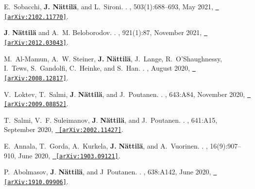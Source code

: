\documentclass[letterpaper, onecolumn, 11pt]{article}
\begin{document}
\begin{thebibliography}{10}
E.~{Sobacchi}, \textbf{J. {N{\"a}ttil{\"a}}}, and L.~{Sironi}.
.
\newblock {\em \mnras}, 503(1):688--693, May 2021,
  \href{http://arxiv.org/abs/2102.11770}{\nolinkurl{ [arXiv:2102.11770]}}.

\textbf{J}. \textbf{N{\"a}ttil{\"a}} and A.~M. {Beloborodov}.
.
\newblock {\em \apj}, 921(1):87, November 2021,
  \href{http://arxiv.org/abs/2012.03043}{\nolinkurl{ [arXiv:2012.03043]}}.

M.~{Al-Mamun}, A.~W. {Steiner}, \textbf{J.} \textbf{N{\"a}ttil{\"a}},
  J.~{Lange}, R.~{O'Shaughnessy}, I.~{Tews}, S.~{Gandolfi}, C.~{Heinke}, and
  S.~{Han}.
.
\newblock {\em \prl}, August 2020,
  \href{http://arxiv.org/abs/2008.12817}{\nolinkurl{ [arXiv:2008.12817]}}.

V.~{Loktev}, T.~{Salmi}, \textbf{J}. \textbf{N{\"a}ttil{\"a}}, and
  J.~{Poutanen}.
.
\newblock {\em \aap}, 643:A84, November 2020,
  \href{http://arxiv.org/abs/2009.08852}{\nolinkurl{ [arXiv:2009.08852]}}.

T.~{Salmi}, V.~F. {Suleimanov}, \textbf{J}. \textbf{N{\"a}ttil{\"a}}, and
  J.~{Poutanen}.
.
\newblock {\em \aap}, 641:A15, September 2020,
  \href{http://arxiv.org/abs/2002.11427}{\nolinkurl{ [arXiv:2002.11427]}}.

E.~{Annala}, T.~{Gorda}, A.~{Kurkela}, \textbf{J.} \textbf{{N{\"a}ttil{\"a}}},
  and A.~{Vuorinen}.
.
, 16(9):907--910, June 2020,
  \href{http://arxiv.org/abs/1903.09121}{\nolinkurl{ [arXiv:1903.09121]}}.

P.~{Abolmasov}, \textbf{J}. \textbf{N{\"a}ttil{\"a}}, and J~{Poutanen}.
.
\newblock {\em \aap}, 638:A142, June 2020,
  \href{http://arxiv.org/abs/1910.09906}{\nolinkurl{ [arXiv:1910.09906]}}.


\end{thebibliography}
\end{document}
